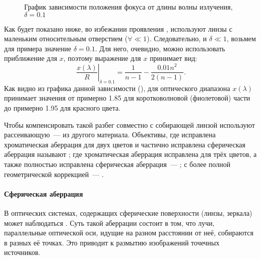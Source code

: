 \begin{wrapfigure}{r}{0.5\tw}
    \centering
    \vspace{-1pc}
    \caption{График зависимости положения фокуса от длины волны излучения, $\delta = 0.1$}
    \label{pic:crown-dispersion-x}
\end{wrapfigure}
Как будет показано ниже, во избежании проявления , используют линзы с маленьким относительным отверстием ($\forall \ll 1$). Следовательно, и $\delta \ll 1$, возьмем для примера значение $\delta = 0.1$. Для него, очевидно, можно использовать приближение для $x$, поэтому выражение для $x$ принимает вид:
\begin{equation*}
    \left.\frac{x(\lambda)}{R}\right|_{\delta = 0.1} = \frac{1}{n-1} - \frac{0.01 n^2}{2(n-1)}.
\end{equation*}
Как видно из графика данной зависимости (), для оптического диапазона $x(\lambda)$ принимает значения от примерно 1.85 для коротковолновой (фиолетовой) части до примерно 1.95 для красного цвета.

Чтобы компенсировать такой разбег совместно с собирающей линзой используют рассеивающую~--- из другого материала. Объективы, где исправлена хроматическая аберрация для двух цветов и частично исправлена сферическая аберрация называют ; где хроматическая аберрация исправлена для трёх цветов, а также полностью исправлена сферическая аберрация~--- ; с более полной геометрической коррекцией~--- .

\paragraph{Сферическая аберрация}
В оптических системах, содержащих сферические поверхности (линзы, зеркала) может наблюдаться . Суть такой аберрации состоит в том, что лучи, параллельные оптической оси, идущие на разном расстоянии от неё, собираются в разных её точках. Это приводит к размытию изображений точечных источников.

